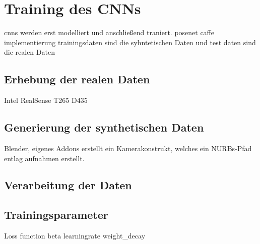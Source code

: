 
\section{Training des CNNs}
cnns werden erst modelliert und anschließend traniert.
posenet caffe implementierung
trainingsdaten sind die syhntetischen Daten und test daten sind die realen Daten


\subsection{Erhebung der realen Daten}
Intel RealSense T265 D435

\subsection{Generierung der synthetischen Daten}
Blender,
eigenes Addons erstellt ein Kamerakonstrukt, welches ein NURBs-Pfad entlag aufnahmen erstellt.

\subsection{Verarbeitung der Daten}

\subsection{Trainingsparameter}

Loss function beta
learningrate
weight_decay
